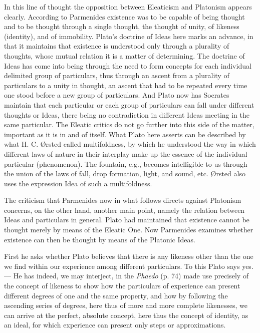 \documentclass[12pt,a4paper,openany]{book}
\newcommand{\opage}[1]{\marginnote{\footnotesize\textit{[#1]}}}
\begin{document}
In this line of thought the opposition between
Eleaticism and Platonism appears clearly. According to Parmenides
existence was to be capable of being thought and to be thought through a single
thought, the thought of unity, of likeness (identity), and of immobility.
Plato’s doctrine of Ideas here marks an advance,
in that it maintains that existence is understood only through a plurality
of thoughts, whose mutual relation it is a matter of determining.
The doctrine of Ideas has come into being through the need to form
concepts for each individual delimited group of particulars, thus
through an ascent from a plurality of particulars to a unity
in thought, an ascent that had to be repeated every
time one stood before a new group of particulars. And Plato
now has Socrates maintain that each particular or each group of particulars
can fall under different thoughts or Ideas,
there being no contradiction in different Ideas meeting
in the same particular. The Eleatic critics do not go further
into this side of the matter, important as it is in and of itself.
What Plato here asserts can be described by what
H. C. Ørsted called multifoldness, by which he understood
the way in which different laws of nature in their interplay
make up the essence of the individual particular (phenomenon). The fountain,
e.g., becomes intelligible to us through the union of the laws
of fall, drop formation, light, and sound, etc. Ørsted
also uses the expression Idea of such a multifoldness.

The criticism that Parmenides now in what follows directs
against Platonism concerns, on the other hand, another main point,
namely the relation between Ideas and particulars in general.
Plato had maintained that existence cannot be thought merely
\setcounter{footnote}{0}%
\opage{8}by means of the Eleatic One. Now Parmenides examines
whether existence can then be thought by means of the Platonic
Ideas.

First he asks whether Plato believes that there is any likeness
other than the one we find within our experience among
different particulars. To this Plato says yes. --- He has indeed,
we may interject, in the \textit{Phaedo} (p. 74) made use precisely of the concept of likeness
to show how the particulars of experience can present
different degrees of one and the same property, and how
by following the ascending series of degrees, here
thus of more and more complete likenesses, we can arrive
at the perfect, absolute concept, here thus the concept of
identity, as an ideal, for which experience can present only
steps or approximations.
\end{document}
